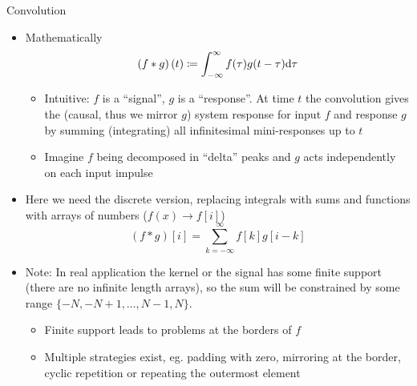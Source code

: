   \begin{frame}{Convolution}
    \begin{itemize}
      \item Mathematically
        \begin{equation*}
          \left(f * g\right)(t) \coloneqq
            \int_{-\infty}^\infty f(\tau)g(t-\tau)\mathrm{d}\tau
        \end{equation*}
      \begin{itemize}
        \item Intuitive: $f$ is a \enquote{signal}, $g$ is a \enquote{response}.
          At time $t$ the convolution gives the (causal, thus we mirror $g$)
          system response for input $f$ and response $g$ by summing (integrating)
          all infinitesimal mini-responses up to $t$
          \item Imagine $f$ being decomposed in \enquote{delta} peaks and $g$
            acts independently on each input impulse
      \end{itemize}
      \item Here we need the discrete version, replacing integrals with sums
      and functions with arrays of numbers ($f(x)\rightarrow f[i]$)
      \begin{equation*}
        (f*g)[i] = \sum_{k=-\infty}^{\infty} f[k]g[i-k]
      \end{equation*}
      \item Note: In real application the kernel or the signal has some finite support
      (there are no infinite length arrays), so the sum will be constrained by
      some range $\{-N, -N+1, \dots, N-1, N\}$.
      \begin{itemize}
        \item Finite support leads to problems at the borders of $f$
        \item Multiple strategies exist, eg. padding with zero,
          mirroring at the border, cyclic repetition or
          repeating the outermost element
      \end{itemize}
    \end{itemize}
  \end{frame}

